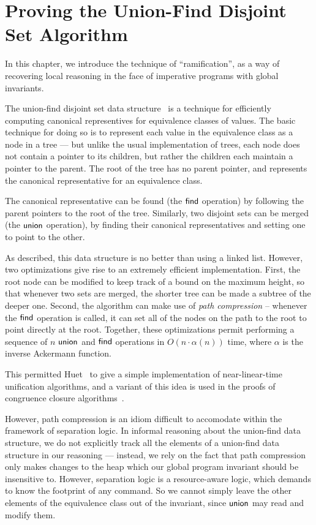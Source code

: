 \chapter{Proving the Union-Find Disjoint Set Algorithm}

In this chapter, we introduce the technique of ``ramification'', as a
way of recovering local reasoning in the face of imperative programs
with global invariants.

The union-find disjoint set data structure~\cite{union-find} is a
technique for efficiently computing canonical representives for
equivalence classes of values. The basic technique for doing so is to
represent each value in the equivalence class as a node in a tree ---
but unlike the usual implementation of trees, each node does not
contain a pointer to its children, but rather the children each
maintain a pointer to the parent. The root of the tree has no parent
pointer, and represents the canonical representative for an
equivalence class.

The canonical representative can be found (the $\mathsf{find}$ operation) by
following the parent pointers to the root of the tree. Similarly, two
disjoint sets can be merged (the $\mathsf{union}$ operation), by finding their
canonical representatives and setting one to point to the other.

As described, this data structure is no better than using a linked
list. However, two optimizations give rise to an extremely efficient
implementation. First, the root node can be modified to keep track of
a bound on the maximum height, so that whenever two sets are merged,
the shorter tree can be made a subtree of the deeper one. Second, the
algorithm can make use of \emph{path compression} -- whenever the $\mathsf{find}$
operation is called, it can set all of the nodes on the path to the
root to point directly at the root. Together, these optimizations
permit performing a sequence of $n$ $\mathsf{union}$ and $\mathsf{find}$ operations in $O(n
\cdot \alpha(n))$ time, where $\alpha$ is the inverse Ackermann
function.

This permitted Huet~\cite{huet-unification} to give a simple
implementation of near-linear-time unification algorithms, and a
variant of this idea is used in the proofs of congruence closure
algorithms~\cite{congruence-closure}.

However, path compression is an idiom difficult to accomodate within
the framework of separation logic. In informal reasoning about the
union-find data structure, we do not explicitly track all the elements
of a union-find data structure in our reasoning --- instead, we rely
on the fact that path compression only makes changes to the heap which
our global program invariant should be insensitive to. However,
separation logic is a resource-aware logic, which demands to know the
footprint of any command. So we cannot simply leave the other elements
of the equivalence class out of the invariant, since $\mathsf{union}$ may read
and modify them.

